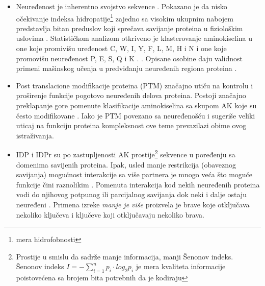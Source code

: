 \begin{itemize}

  \item
    Neuređenost je inherentno svojstvo sekvence \parencite{dunker2001}.
    Pokazano je da nisko očekivanje indeksa hidropatije\footnote{mera hidrofobnosti} zajedno sa visokim
    ukupnim nabojem predstavlja bitan preduslov koji sprečava savijanje
    proteina u fiziološkim uslovima \parencite{uversky2016}. Statističkom
    analizom otkriveno je klasterovanje aminokiselina u one koje promivišu
    uređenost C, W, I, Y, F, L, M, H i N  i one koje
    promovišu neuređenost P, E, S, Q i K .
    \parencite{oldfield2014, uversky2016}. Opisane osobine daju validnost
    primeni mašinskog učenja u predviđanju neuređenih regiona proteina
    \parencite{oldfield2014}.

  \item
    Post translacione modifikacije proteina (PTM) značajno utiču na  kontrolu i
    proširenje funkcije pogotovo neuređenih delova proteina. Postoji značajno
    preklapanje gore pomenute klasifikacije aminokiselina sa skupom AK koje su
    često modifikovane \parencite{uversky2016}. Iako je PTM povezano sa
    neuređenošću i sugeriše veliki uticaj na funkciju proteina
    \parencite{uversky2016} kompleksnost ove teme prevazilazi obime ovog
    istraživanja.

  \item
    IDP i IDPr su po zastupljenosti AK prostije\footnote{ Prostije u smislu da
      sadrže manje informacija, manji  Šenonov indeks.\\ Šenonov indeks $I = - \sum^n_{i=1} p_i \cdot log_2{p_i} $
    je mera kvaliteta informacije poistovećena sa brojem bita potrebnih da je kodiraju }
    sekvence u poređenju sa domenima savijenih proteina. Ipak, usled manje
    restrikcija (obaveznog savijanja) mogućnost interakcije sa više partnera je
    mnogo veća što moguće funkcije čini raznolikim \parencite{uversky2016}.
    Pomenuta interakcija kod nekih neuređenih proteina vodi do njihovog
    potpunog ili parcijalnog savijanja dok neki i dalje ostaju neuređeni
    \parencite{uversky2016}.  Primena izreke \textit{manje je više} proizvela
    je brave koje otključava nekoliko ključeva i ključeve koji otključavaju
    nekoliko brava.


\end{itemize}
